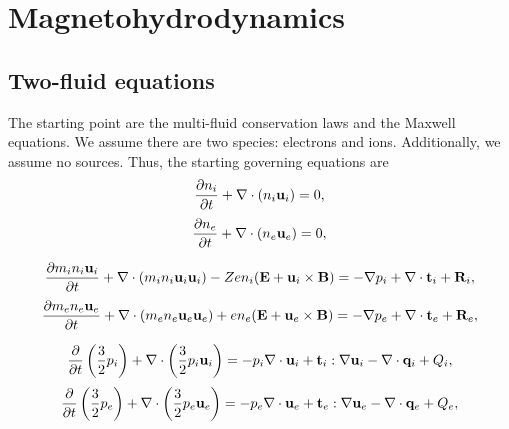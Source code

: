 \documentclass[a4paper,11pt]{report}
\begin{document}
\chapter{Magnetohydrodynamics}
\section{Two-fluid equations}
\label{sec:two_fluid_equations}
The starting point are the multi-fluid conservation laws and the Maxwell equations. We assume there are two species: electrons and ions. Additionally, we assume no sources. Thus, the starting governing equations are
\begin{equation}
\label{eq:twof_ni}
    \frac{\partial n_i}{\partial t} + \nabla \cdot \left ( n_i \mathbf{u}_i \right ) = 0,
\end{equation}
\begin{equation}
\label{eq:twof_ne}
    \frac{\partial n_e}{\partial t} + \nabla \cdot \left ( n_e \mathbf{u}_e \right ) = 0,
\end{equation}

\begin{equation}
\label{eq:twof_ui}
    \frac{\partial m_i n_i \mathbf{u}_i}{\partial t} + \nabla \cdot \left ( m_i n_i \mathbf{u}_i \mathbf{u}_i \right) - Z e n_i ( \mathbf{E} + \mathbf{u}_i \times \mathbf{B} ) = - \nabla p_i + \nabla \cdot \mathbf{t}_i + \mathbf{R}_i,
\end{equation}
\begin{equation}
\label{eq:twof_ue}
    \frac{\partial m_e n_e \mathbf{u}_e}{\partial t} + \nabla \cdot \left ( m_e n_e \mathbf{u}_e \mathbf{u}_e \right) + e n_e ( \mathbf{E} + \mathbf{u}_e \times \mathbf{B} ) = - \nabla p_e + \nabla \cdot \mathbf{t}_e + \mathbf{R}_e,
\end{equation}

\begin{equation}
\label{eq:twof_iei}
    \frac{\partial}{\partial t} \left ( \frac{3}{2} p_i \right ) + \nabla \cdot \left ( \frac{3}{2} p_i \mathbf{u}_i \right ) = -p_i \nabla \cdot \mathbf{u}_i + \mathbf{t}_i : \nabla \mathbf{u}_i - \nabla \cdot \mathbf{q}_i + Q_i,
\end{equation}
\begin{equation}
\label{eq:twof_iee}
    \frac{\partial}{\partial t} \left ( \frac{3}{2} p_e \right ) + \nabla \cdot \left ( \frac{3}{2} p_e \mathbf{u}_e \right ) = -p_e \nabla \cdot \mathbf{u}_e + \mathbf{t}_e : \nabla \mathbf{u}_e - \nabla \cdot \mathbf{q}_e + Q_e,
\end{equation}
\end{document}

